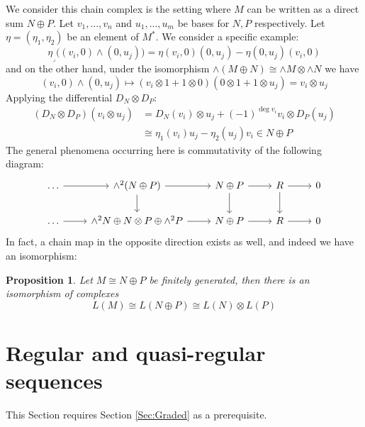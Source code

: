 \documentclass[12pt]{article}
\theoremstyle{plain}
\newtheorem{proposition}[thm]{Proposition}
\theoremstyle{definition}
\begin{document}
We consider this chain complex is the setting where $M$ can be written as a direct sum $N \oplus P$. Let $v_1,...,v_n$ and $u_1,...,u_m$ be bases for $N,P$ respectively.  Let $\eta = (\eta_1,\eta_2)$ be an element of $M^\ast$. We consider a specific example:
\begin{equation}
\eta_{\lrcorner}\big((v_{i},0) \wedge (0,u_{j})\big) = \eta(v_i,0)(0,u_j) - \eta(0,u_j)(v_i,0)
\end{equation}
and on the other hand, under the isomorphism $\wedge(M \oplus N) \cong \wedge M \otimes \wedge N$ we have
\begin{equation}
(v_i, 0) \wedge (0,u_j) \longmapsto (v_i \otimes 1 + 1 \otimes 0)(0 \otimes 1 + 1 \otimes u_j) = v_i \otimes u_j
\end{equation}
Applying the differential $D_N \otimes D_P$:
\begin{align*}
(D_N \otimes D_P)(v_i \otimes u_j) &= D_N(v_i) \otimes u_j + (-1)^{\operatorname{deg}v_i}v_i \otimes D_P(u_j)\\
&\cong \eta_1(v_i)u_j - \eta_2(u_j)v_i \in N \oplus P
\end{align*}
The general phenomena occurring here is commutativity of the following diagram:
\begin{equation}
\begin{tikzcd}
\hdots\arrow[r] & \wedge^2(N \oplus P)\arrow[r]\arrow[d] & N \oplus P\arrow[r]\arrow[d] & R\arrow[r]\arrow[d] & 0\\
\hdots\arrow[r] & \wedge^2 N \oplus N \otimes P \oplus  \wedge^2 P\arrow[r] & N \oplus P\arrow[r] & R\arrow[r] & 0 
\end{tikzcd}
\end{equation}
In fact, a chain map in the opposite direction exists as well, and indeed we have an isomorphism:
\begin{proposition}\label{prop:diff_tens_sum}
Let $M \cong N \oplus P$ be finitely generated, then there is an isomorphism of complexes
\begin{equation}
L(M) \cong L(N \oplus P) \cong  L(N) \otimes L(P)
\end{equation}
\end{proposition}
\section{Regular and quasi-regular sequences}
This Section requires Section \ref{Sec:Graded} as a prerequisite.
\end{document}
